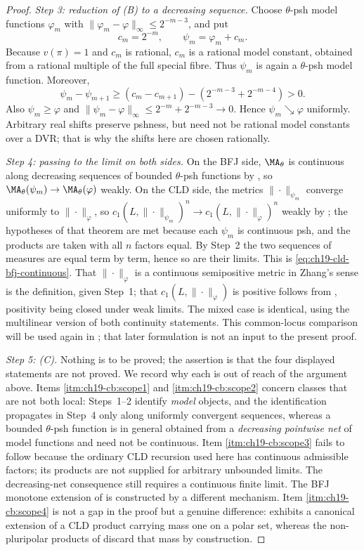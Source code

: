 \begin{proof}
\emph{Step 3: reduction of (B) to a decreasing sequence.}  Choose
$\theta$-psh model functions $\varphi_m$ with
$\|\varphi_m-\varphi\|_\infty\leq2^{-m-3}$, and put
\[
 c_m=2^{-m},\qquad \psi_m=\varphi_m+c_m.
\]
Because $v(\pi)=1$ and $c_m$ is rational, $c_m$ is a rational model
constant, obtained from a rational multiple of the full special fibre.
Thus $\psi_m$ is again a $\theta$-psh model function.  Moreover,
\[
 \psi_m-\psi_{m+1}
 \geq(c_m-c_{m+1})-(2^{-m-3}+2^{-m-4})>0.
\]
Also $\psi_m\geq\varphi$ and
$\|\psi_m-\varphi\|_\infty\leq2^{-m}+2^{-m-3}\to0$.
Hence $\psi_m\searrow\varphi$ uniformly.  Arbitrary real shifts preserve
pshness, but need not be rational model constants over a DVR; that is why
the shifts here are chosen rationally.

\emph{Step 4: passing to the limit on both sides.}  On the BFJ side,
$\MA_\theta$ is continuous along decreasing sequences of bounded
$\theta$-psh functions by , so
$\MA_\theta(\psi_m)\to\MA_\theta(\varphi)$ weakly.  On the CLD side, the
metrics $\|\cdot\|_{\psi_m}$ converge uniformly to $\|\cdot\|_\varphi$, so
$c_1(L,\|\cdot\|_{\psi_m})^n\to c_1(L,\|\cdot\|_\varphi)^n$ weakly by
; the hypotheses of that theorem are met because
each $\psi_m$ is continuous psh, and the products are taken with all $n$
factors equal.  By Step~2 the two sequences of measures are equal term by
term, hence so are their limits.  This is
\eqref{eq:ch19-cld-bfj-continuous}.  That $\|\cdot\|_\varphi$ is a
continuous semipositive metric in Zhang's sense is the definition, given
Step~1; that $c_1(L,\|\cdot\|_\varphi)$ is positive follows from
, positivity being closed under weak limits.
The mixed case is identical, using the multilinear version of both
continuity statements.  This common-locus comparison will be used again
in ; that later formulation is not an
input to the present proof.

\emph{Step 5: (C).}  Nothing is to be proved; the assertion is that the
four displayed statements are not proved.  We record why each is out of
reach of the argument above.  Items \cref{itm:ch19-cb:scope1} and
\cref{itm:ch19-cb:scope2} concern classes that are not both local: Steps~1--2
identify \emph{model} objects, and the identification propagates in Step~4
only along uniformly convergent sequences, whereas a bounded $\theta$-psh
function is in general obtained from a \emph{decreasing pointwise net}
of model functions and need not be continuous.  Item
\cref{itm:ch19-cb:scope3} fails to follow because the ordinary CLD
recursion used here has continuous admissible factors; its products are not
supplied for arbitrary unbounded limits.  The decreasing-net consequence
 still requires a continuous finite limit.
The BFJ monotone extension of
 is constructed by a different mechanism.
Item \cref{itm:ch19-cb:scope4} is not a gap in the proof but a genuine
difference:  exhibits a canonical extension of a
CLD product carrying mass one on a polar set, whereas the non-pluripolar
products of  discard that mass by construction.
\end{proof}

